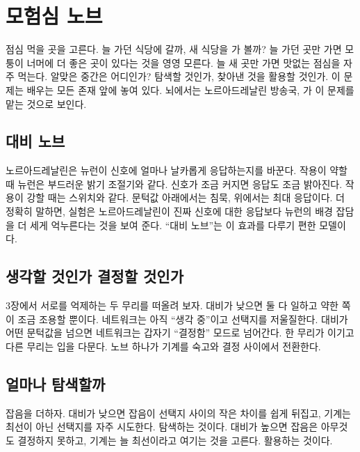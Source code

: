 \chapter{모험심 노브}

점심 먹을 곳을 고른다. 늘 가던 식당에 갈까, 새 식당을 가 볼까? 늘 가던 곳만 가면 모퉁이 너머에 더 좋은 곳이 있다는 것을 영영 모른다. 늘 새 곳만 가면 맛없는 점심을 자주 먹는다. 알맞은 중간은 어디인가? 탐색할 것인가, 찾아낸 것을 활용할 것인가. 이 문제는 배우는 모든 존재 앞에 놓여 있다. 뇌에서는 노르아드레날린 방송국, 가 이 문제를 맡는 것으로 보인다.

\section*{대비 노브}

노르아드레날린은 뉴런이 신호에 얼마나 날카롭게 응답하는지를 바꾼다. 작용이 약할 때 뉴런은 부드러운 밝기 조절기와 같다. 신호가 조금 커지면 응답도 조금 밝아진다. 작용이 강할 때는 스위치와 같다. 문턱값 아래에서는 침묵, 위에서는 최대 응답이다. 더 정확히 말하면, 실험은 노르아드레날린이 진짜 신호에 대한 응답보다 뉴런의 배경 잡담을 더 세게 억누른다는 것을 보여 준다. “대비 노브”는 이 효과를 다루기 편한 모델이다.


\section*{생각할 것인가 결정할 것인가}

3장에서 서로를 억제하는 두 무리를 떠올려 보자. 대비가 낮으면 둘 다 일하고 약한 쪽이 조금 조용할 뿐이다. 네트워크는 아직 “생각 중”이고 선택지를 저울질한다. 대비가 어떤 문턱값을 넘으면 네트워크는 갑자기 “결정함” 모드로 넘어간다. 한 무리가 이기고 다른 무리는 입을 다문다. 노브 하나가 기계를 숙고와 결정 사이에서 전환한다.

\section*{얼마나 탐색할까}

잡음을 더하자. 대비가 낮으면 잡음이 선택지 사이의 작은 차이를 쉽게 뒤집고, 기계는 최선이 아닌 선택지를 자주 시도한다. 탐색하는 것이다. 대비가 높으면 잡음은 아무것도 결정하지 못하고, 기계는 늘 최선이라고 여기는 것을 고른다. 활용하는 것이다.

